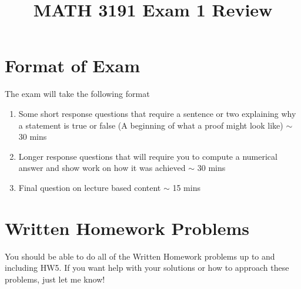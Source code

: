 \documentclass[12pt]{article}
\title{MATH 3191 Exam 1 Review}
\date{}
\begin{document}
  \maketitle
\section{Format of Exam}
The exam will take the following format
\begin{enumerate}
    \item Some short response questions that require a sentence or two explaining why a statement
        is true or false (A beginning of what a proof might look like) $\sim$ 30 mins
    \item Longer response questions that will require you to compute a numerical answer and show work
        on how it was achieved $\sim$ 30 mins
    \item Final question on lecture based content $\sim$ 15 mins
\end{enumerate}
\section{Written Homework Problems}
You should be able to do all of the Written Homework problems up to and including HW5. If you want
help with your solutions or how to approach these problems, just let me know!
\end{document}
